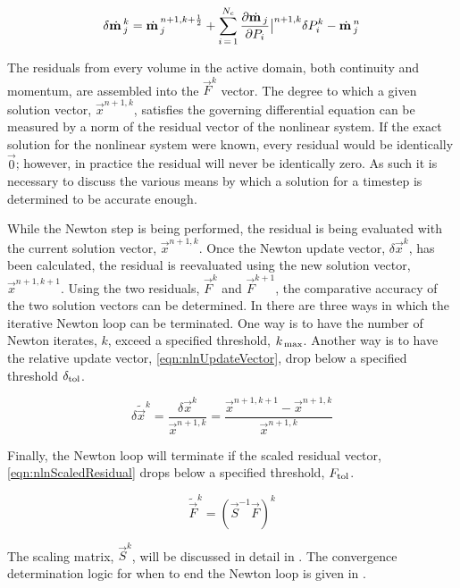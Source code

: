 \begin{equation}
\label{eqn:deltaMomenta}
\delta \momVec{}^{k}_{j} = \momVec{}^{n+1,k + \onehalf}_{j} + \sum^{N_{c}}_{i\,=\,1} \frac{\partial \momVec{}_{j}}{\partial P_{i}}\big|^{n+1,k} \delta P^{k}_{i} - \momVec{}^{n}_{j}
\end{equation}

The residuals from every volume in the active domain, both continuity and momentum, are assembled into the $\vec{F}^{k}$ vector.
The degree to which a given solution vector, $\vec{x}^{n+1, k}$, satisfies the governing differential equation can be measured by a norm of the residual vector of the nonlinear system.
If the exact solution for the nonlinear system were known, every residual would be identically $\vec{0}$; however, in practice the residual will never be identically zero.
As such it is necessary to discuss the various means by which a solution for a timestep is determined to be accurate enough.

While the Newton step is being performed, the residual is being evaluated with the current solution vector, $\vec{x}^{n+1,k}$.
Once the Newton update vector, $\delta \vec{x}^{k}$, has been calculated, the residual is reevaluated using the new solution vector, $\vec{x}^{n+1, k+1}$.
Using the two residuals, $\vec{F}^{k}$ and $\vec{F}^{k+1}$, the comparative accuracy of the two solution vectors can be determined.
In \cobra{} there are three ways in which the iterative Newton loop can be terminated.
One way is to have the number of Newton iterates, $k$, exceed a specified threshold, $\kmax{}$.
Another way is to have the relative update vector, \eqref{eqn:nlnUpdateVector}, drop below a specified threshold $\dtol{}$.

\begin{equation}
\label{eqn:nlnUpdateVector}
\delta \tilde{\vec{x}}^{k} = \frac{\delta \vec{x}^{k}}{\vec{x}^{n+1, k}} = \frac{ \vec{x}^{n+1, k+1} - \vec{x}^{n+1, k}}{\vec{x}^{n+1,k}}
\end{equation}

Finally, the Newton loop will terminate if the scaled residual vector, \eqref{eqn:nlnScaledResidual} drops below a specified threshold, $\ftol{}$.

\begin{equation}
\label{eqn:nlnScaledResidual}
\tilde{\vec{F}}^{k} = (\vec{S}^{-1}\vec{F})^{k}
\end{equation}

The scaling matrix, $\vec{S}^{k}$, will be discussed in detail in .
The convergence determination logic for when to end the Newton loop is given in .


